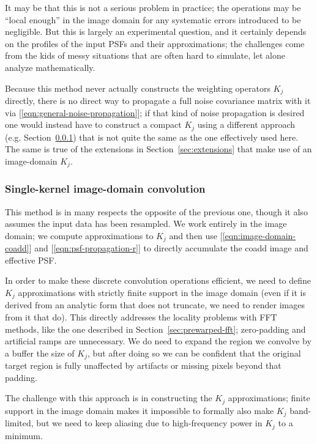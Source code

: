 \documentclass[DM,authoryear,toc]{lsstdoc}
\begin{document}
It may be that this is not a serious problem in practice; the operations may be ``local enough'' in the image domain for any systematic errors introduced to be negligible.
But this is largely an experimental question, and it certainly depends on the profiles of the input PSFs and their approximations; the challenges come from the kids of messy situations that are often hard to simulate, let alone analyze mathematically.

Because this method never actually constructs the weighting operators $K_j$ directly, there is no direct way to propagate a full noise covariance matrix with it via [\ref{eqn:general-noise-propagation}]; if that kind of noise propagation is desired one would instead have to construct a compact $K_j$ using a different approach (e.g. Section~\ref{sec:prewarped-image-domain}) that is not quite the same as the one effectively used here.
The same is true of the extensions in Section~\ref{sec:extensions} that make use of an image-domain $K_j$.

\subsubsection{Single-kernel image-domain convolution}

\label{sec:prewarped-image-domain}

This method is in many respects the opposite of the previous one, though it also assumes the input data has been resampled.
We work entirely in the image domain; we compute approximations to $K_j$ and then use [\ref{eqn:image-domain-coadd}] and [\ref{eqn:psf-propagation-r}] to directly accumulate the coadd image and effective PSF.

In order to make these discrete convolution operations efficient, we need to define $K_j$ approximations with strictly finite support in the image domain (even if it is derived from an analytic form that does not truncate, we need to render images from it that do).
This directly addresses the locality problems with FFT methods, like the one described in Section~\ref{sec:prewarped-fft}; zero-padding and artificial ramps are unnecessary.
We do need to expand the region we convolve by a buffer the size of $K_j$, but after doing so we can be confident that the original target region is fully unaffected by artifacts or missing pixels beyond that padding.

The challenge with this approach is in constructing the $K_j$ approximations; finite support in the image domain makes it impossible to formally also make $K_j$ band-limited, but we need to keep aliasing due to high-frequency power in $K_j$ to a minimum.
\end{document}
